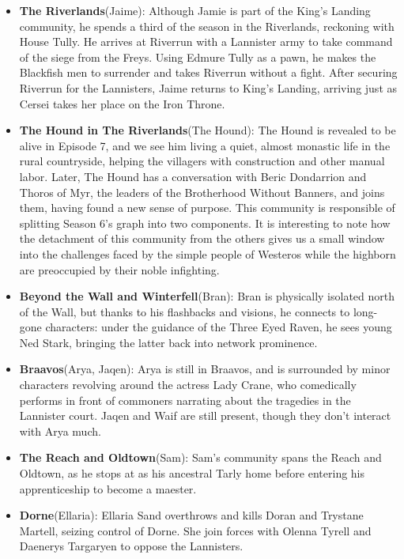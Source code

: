 \documentclass[10pt,twocolumn,letterpaper]{article}
\begin{document}
\begin{itemize}
    \item \textbf{The Riverlands}(Jaime): Although Jamie is part of the King's Landing community, he spends a third of the season in the Riverlands, reckoning with House Tully. He arrives at Riverrun with a Lannister army to take command of the siege from the Freys. Using Edmure Tully as a pawn, he makes the Blackfish men to surrender and takes Riverrun without a fight. After securing Riverrun for the Lannisters, Jaime returns to King's Landing, arriving just as Cersei takes her place on the Iron Throne.
    \item \textbf{The Hound in The Riverlands}(The Hound): The Hound is revealed to be alive in Episode 7, and we see him living a quiet, almost monastic life in the rural countryside, helping the villagers with construction and other manual labor. Later, The Hound has a conversation with Beric Dondarrion and Thoros of Myr, the leaders of the Brotherhood Without Banners, and joins them, having found a new sense of purpose. This community is responsible of splitting Season 6's graph into two components. It is interesting to note how the detachment of this community from the others gives us a small window into the challenges faced by the simple people of Westeros while the highborn are preoccupied by their noble infighting.
    \item \textbf{Beyond the Wall and Winterfell}(Bran): Bran is physically isolated north of the Wall, but thanks to his flashbacks and visions, he connects to long-gone characters: under the guidance of the Three Eyed Raven, he sees young Ned Stark, bringing the latter back into network prominence. 
    \item \textbf{Braavos}(Arya, Jaqen): Arya is still in Braavos, and is surrounded by minor characters revolving around the actress Lady Crane, who comedically performs in front of commoners narrating about the tragedies in the Lannister court. Jaqen and Waif are still present, though they don't interact with Arya much.
    \item \textbf{The Reach and Oldtown}(Sam): Sam’s community spans the Reach and Oldtown, as he stops at as his ancestral Tarly home before entering his apprenticeship to become a maester. 
    \item \textbf{Dorne}(Ellaria): Ellaria Sand overthrows and kills Doran and Trystane Martell, seizing control of Dorne. She join forces with Olenna Tyrell and Daenerys Targaryen to oppose the Lannisters.
    
    
\end{itemize}
\end{document}
